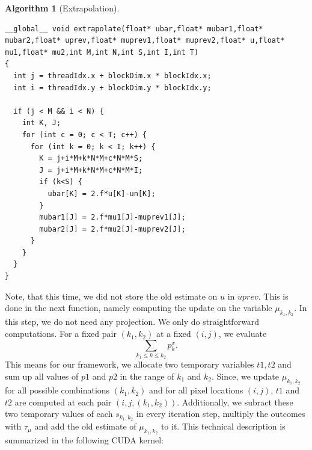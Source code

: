 \documentclass{scrreprt}
\newtheorem{algorithm}[theorem]{Algorithm}
\begin{document}
            \begin{algorithm}[Extrapolation]
            \label{alg:extrapolation_cuda}
                \begin{lstlisting}
__global__ void extrapolate(float* ubar,float* mubar1,float* mubar2,float* uprev,float* muprev1,float* muprev2,float* u,float* mu1,float* mu2,int M,int N,int S,int I,int T)
{
  int j = threadIdx.x + blockDim.x * blockIdx.x;
  int i = threadIdx.y + blockDim.y * blockIdx.y;

  if (j < M && i < N) {
    int K, J;
    for (int c = 0; c < T; c++) {
      for (int k = 0; k < I; k++) {
        K = j+i*M+k*N*M+c*N*M*S;
        J = j+i*M+k*N*M+c*N*M*I;
        if (k<S) {
          ubar[K] = 2.f*u[K]-un[K];
        }
        mubar1[J] = 2.f*mu1[J]-muprev1[J];
        mubar2[J] = 2.f*mu2[J]-muprev2[J];
      }
    }
  }
}
                \end{lstlisting}
            \end{algorithm}

            Note, that this time, we did not store the old estimate on $u$ in $uprev$. This is done in the next function, namely computing the update on the variable $\mu_{k_{1}, k_{2}}$. In this step, we do not need any projection. We only do straightforward computations. For a fixed pair $(k_{1}, k_{2})$ at a fixed $(i,j)$, we evaluate
                $$
                    \sum_{k_{1} \le k \le k_{2}} p_{k}^{x}.
                $$
            This means for our framework, we allocate two temporary variables $t1, t2$ and sum up all values of $p1$ and $p2$ in the range of $k_{1}$ and $k_{2}$. Since, we update $\mu_{k_{1}, k_{2}}$ for all possible combinations $(k_{1}, k_{2})$ and for all pixel locations $(i,j)$, $t1$ and $t2$ are computed at each pair $(i, j, (k_{1}, k_{2}))$. Additionally, we subract these two temporary values of each $s_{k_{1}, k_{2}}$ in every iteration step, multiply the outcomes with $\tau_{\mu}$ and add the old estimate of $\mu_{k_{1}, k_{2}}$ to it. This technical description is summarized in the following CUDA kernel:
\end{document}
